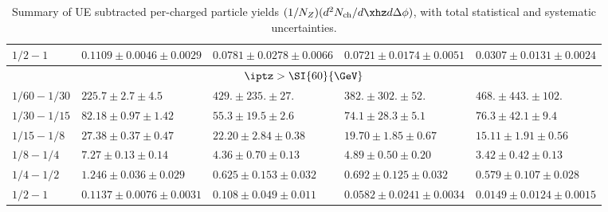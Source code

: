 \begin{table}[!ht]
\begin{center}
\begin{tabular}{|l|l|l|l|l|}
\footnotesize {$1/2 - 1$} & \scriptsize {$0.1109 \pm 0.0046 \pm 0.0029$}  & \scriptsize {$0.0781 \pm 0.0278 \pm 0.0066$}  & \scriptsize {$0.0721 \pm 0.0174 \pm 0.0051$}  & \scriptsize {$0.0307 \pm 0.0131 \pm 0.0024$}  \\
\hline \hline
\multicolumn{5}{|c|}{\small {$\iptz > \SI{60}{\GeV}$}} \\ \hline
\footnotesize {$1/60 - 1/30$} & \scriptsize {$225.7 \pm 2.7 \pm 4.5$}  & \scriptsize {$429. \pm 235. \pm 27.$}  & \scriptsize {$382. \pm 302. \pm 52.$}  & \scriptsize {$468. \pm 443. \pm 102.$}  \\
\footnotesize {$1/30 - 1/15$} & \scriptsize {$82.18 \pm 0.97 \pm 1.42$}  & \scriptsize {$55.3 \pm 19.5 \pm 2.6$}  & \scriptsize {$74.1 \pm 28.3 \pm 5.1$}  & \scriptsize {$76.3 \pm 42.1 \pm 9.4$}  \\
\footnotesize {$1/15 - 1/8$} & \scriptsize {$27.38 \pm 0.37 \pm 0.47$}  & \scriptsize {$22.20 \pm 2.84 \pm 0.38$}  & \scriptsize {$19.70 \pm 1.85 \pm 0.67$}  & \scriptsize {$15.11 \pm 1.91 \pm 0.56$}  \\
\footnotesize {$1/8 - 1/4$} & \scriptsize {$7.27 \pm 0.13 \pm 0.14$}  & \scriptsize {$4.36 \pm 0.70 \pm 0.13$}  & \scriptsize {$4.89 \pm 0.50 \pm 0.20$}  & \scriptsize {$3.42 \pm 0.42 \pm 0.13$}  \\
\footnotesize {$1/4 - 1/2$} & \scriptsize {$1.246 \pm 0.036 \pm 0.029$}  & \scriptsize {$0.625 \pm 0.153 \pm 0.032$}  & \scriptsize {$0.692 \pm 0.125 \pm 0.032$}  & \scriptsize {$0.579 \pm 0.107 \pm 0.028$}  \\
\footnotesize {$1/2 - 1$} & \scriptsize {$0.1137 \pm 0.0076 \pm 0.0031$}  & \scriptsize {$0.108 \pm 0.049 \pm 0.011$}  & \scriptsize {$0.0582 \pm 0.0241 \pm 0.0034$}  & \scriptsize {$0.0149 \pm 0.0124 \pm 0.0015$}  \\
\hline
\end{tabular}
\caption{Summary of UE subtracted per-\Zboson charged particle yields $(1/N_Z)(d^2N_\mathrm{ch}/d\xhz d\Delta\phi)$, with total statistical and systematic uncertainties.}
\label{tab2}
\end{center}
\end{table}
